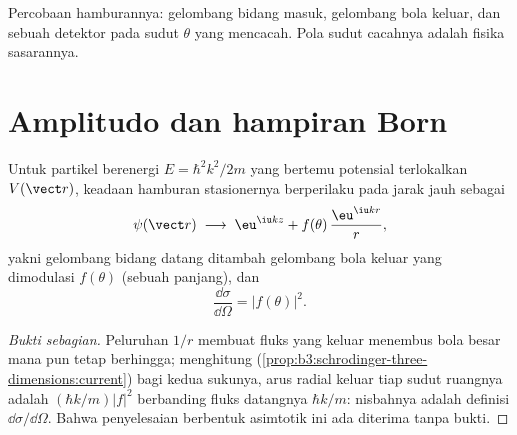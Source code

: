 \begin{omfigure}

{\small Percobaan hamburannya: gelombang bidang masuk, gelombang bola
keluar, dan sebuah detektor pada sudut $\theta$ yang mencacah. Pola
sudut cacahnya adalah fisika sasarannya.}
\end{omfigure}

\section{Amplitudo dan hampiran Born}

\begin{theorem}\label{thm:b3:scattering-theory:amplitude}
Untuk partikel berenergi $E = \hbar^2k^2/2m$ yang bertemu potensial
terlokalkan $V(\vect r)$, keadaan hamburan stasionernya berperilaku pada
jarak jauh sebagai
\[
\psi(\vect r) \;\longrightarrow\;
\eu^{\iu kz} + f(\theta)\,\frac{\eu^{\iu kr}}{r} ,
\]
yakni gelombang bidang datang ditambah gelombang bola keluar yang
dimodulasi \emph{} $f(\theta)$ (sebuah panjang), dan
\[
\frac{\dd\sigma}{\dd\Omega} = |f(\theta)|^2 .
\]
\end{theorem}

\begin{proof}[Bukti sebagian]
Peluruhan $1/r$ membuat fluks yang keluar menembus bola besar mana pun
tetap berhingga; menghitung 
(\cref{prop:b3:schrodinger-three-dimensions:current}) bagi kedua
sukunya, arus radial keluar tiap sudut ruangnya adalah
$(\hbar k/m)|f|^2$ berbanding fluks datangnya $\hbar k/m$: nisbahnya
adalah definisi $\dd\sigma/\dd\Omega$. Bahwa penyelesaian berbentuk
asimtotik ini ada diterima tanpa bukti.
\end{proof}

